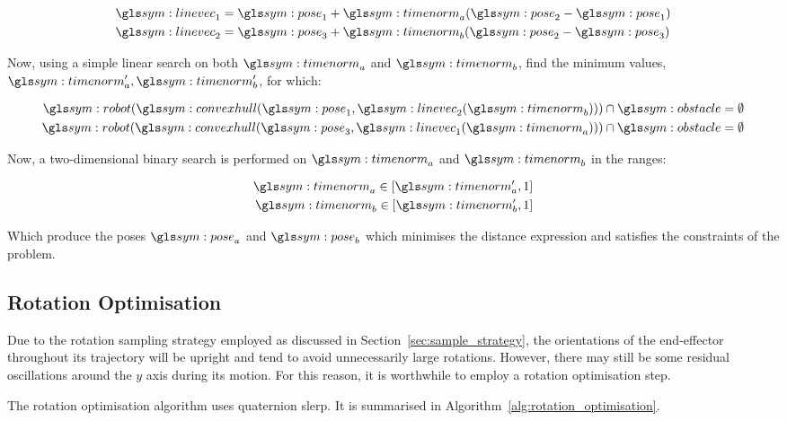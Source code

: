 		\begin{align}
			\linevec_1 &= \pose_1 + \timenorm_a(\pose_2 - \pose_1)\\
			\linevec_2 &= \pose_3 + \timenorm_b(\pose_2 - \pose_3)\\
		\end{align}

		Now, using a simple linear search on both $\timenorm_a$ and
		$\timenorm_b$, find the minimum values, $\timenorm_a',
		\timenorm_b'$, for which:

		\begin{align}
			\robot(\convexhull(\pose_1, \linevec_2(\timenorm_b))) \cap
				\obstacle = \emptyset\\
			\robot(\convexhull(\pose_3, \linevec_1(\timenorm_a))) \cap
				\obstacle = \emptyset
		\end{align}

		Now, a two-dimensional binary search is performed on $\timenorm_a$
		and $\timenorm_b$ in the ranges:

		\begin{align}
			\timenorm_a \in [\timenorm_a', 1]\\
			\timenorm_b \in [\timenorm_b', 1]
		\end{align}

		Which produce the poses $\pose_a$ and $\pose_b$ which minimises the
		distance expression and satisfies the constraints of the problem.

	\subsection{Rotation Optimisation}%
	\label{sec:rotation_optimisation}

		Due to the rotation sampling strategy employed as discussed in
		Section~\ref{sec:sample_strategy}, the orientations of the end-effector
		throughout its trajectory will be upright and tend to avoid
		unnecessarily large rotations. However, there may still be some residual
		oscillations around the $y$ axis during its motion. For this reason,
		it is worthwhile to employ a rotation optimisation step.

		The rotation optimisation algorithm uses quaternion \gls{slerp}. It is
		summarised in Algorithm~\ref{alg:rotation_optimisation}.

